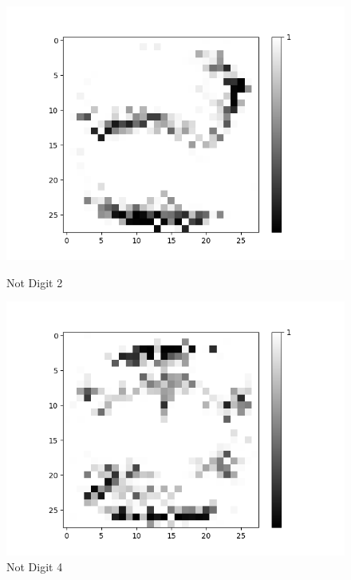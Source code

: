 \begin{figure}[H]
\begin{minipage}[b]{0.19\textwidth}
		\includegraphics[width=\textwidth]{AND(LSM)/Negative/Layer0-Neuron-2.png}
		\caption{Not Digit 2}
	\end{minipage}
	\begin{minipage}[b]{0.19\textwidth}
		\captionsetup{labelformat=empty}
		\includegraphics[width=\textwidth]{AND(LSM)/Negative/Layer0-Neuron-4.png}
		\caption{Not Digit 4}
	\end{minipage}
	\begin{minipage}[b]{0.19\textwidth}
		\captionsetup{labelformat=empty}

\end{minipage}
\end{figure}
